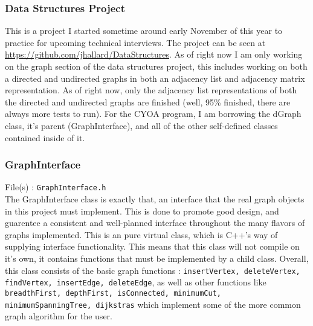 \documentclass[a4paper,11pt]{article}
\begin{document}
    \subsubsection{Data Structures Project}
    This is a project I started sometime around early November of this year to practice for upcoming technical interviews. The project can be seen at \url{https://github.com/jhallard/DataStructures}. As of right now I am only working on the graph section of the data structures project, this includes working on both a directed and undirected graphs in both an adjacency list and adjacency matrix representation. As of right now, only the adjacency list representations of both the directed and undirected graphs are finished (well, 95\% finished, there are always more tests to run). For the CYOA program, I am borrowing the dGraph class, it's parent (GraphInterface), and all of the other self-defined classes contained inside of it. 

    \subsubsection{GraphInterface}
    File(s) : \texttt{GraphInterface.h} \\
    The GraphInterface class is exactly that, an interface that the real graph objects in this project must implement. This is done to promote good design, and guarentee a consistent and well-planned interface throughout the many flavors of graphs implemented. This is an pure virtual class, which is C++'s way of supplying interface functionality. This means that this class will not compile on it's own, it contains functions that must be implemented by a child class. Overall, this class consists of the basic graph functions : \texttt{insertVertex, deleteVertex, findVertex, insertEdge, deleteEdge}, as well as other functions like \texttt{breadthFirst, depthFirst, isConnected, minimumCut, minimumSpanningTree, dijkstras} which implement some of the more common graph algorithm for the user. 
\end{document}
